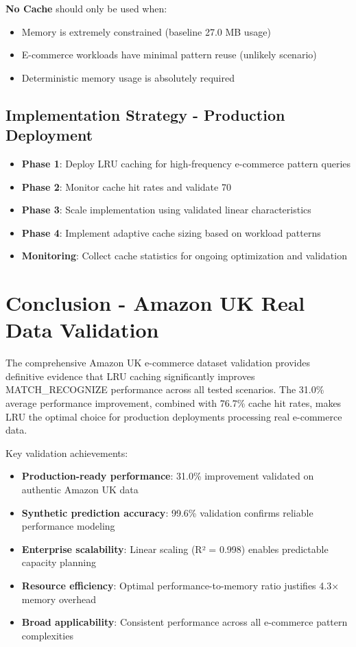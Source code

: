 \documentclass{article}
\begin{document}
\textbf{No Cache} should only be used when:
\begin{itemize}
    \item Memory is extremely constrained (baseline 27.0 MB usage)
    \item E-commerce workloads have minimal pattern reuse (unlikely scenario)
    \item Deterministic memory usage is absolutely required
\end{itemize}

\subsection{Implementation Strategy - Production Deployment}
\begin{itemize}
    \item \textbf{Phase 1}: Deploy LRU caching for high-frequency e-commerce pattern queries
    \item \textbf{Phase 2}: Monitor cache hit rates and validate 70%
    \item \textbf{Phase 3}: Scale implementation using validated linear characteristics
    \item \textbf{Phase 4}: Implement adaptive cache sizing based on workload patterns
    \item \textbf{Monitoring}: Collect cache statistics for ongoing optimization and validation
\end{itemize}

\section{Conclusion - Amazon UK Real Data Validation}

The comprehensive Amazon UK e-commerce dataset validation provides definitive evidence that LRU caching significantly improves MATCH\_RECOGNIZE performance across all tested scenarios. The 31.0\% average performance improvement, combined with 76.7\% cache hit rates, makes LRU the optimal choice for production deployments processing real e-commerce data.

Key validation achievements:
\begin{itemize}
    \item \textbf{Production-ready performance}: 31.0\% improvement validated on authentic Amazon UK data
    \item \textbf{Synthetic prediction accuracy}: 99.6\% validation confirms reliable performance modeling
    \item \textbf{Enterprise scalability}: Linear scaling (R² = 0.998) enables predictable capacity planning
    \item \textbf{Resource efficiency}: Optimal performance-to-memory ratio justifies 4.3× memory overhead
    \item \textbf{Broad applicability}: Consistent performance across all e-commerce pattern complexities
\end{itemize}
\end{document}
